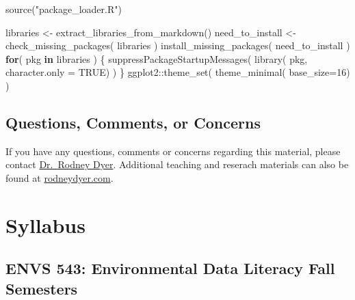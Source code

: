 \documentclass[
  letterpaper,
]{book}
\newenvironment{Shaded}{\begin{snugshade}}{\end{snugshade}}
\newcommand{\AttributeTok}[1]{\textcolor[rgb]{0.40,0.45,0.13}{#1}}
\newcommand{\ConstantTok}[1]{\textcolor[rgb]{0.56,0.35,0.01}{#1}}
\newcommand{\ControlFlowTok}[1]{\textcolor[rgb]{0.00,0.23,0.31}{\textbf{#1}}}
\newcommand{\DecValTok}[1]{\textcolor[rgb]{0.68,0.00,0.00}{#1}}
\newcommand{\FunctionTok}[1]{\textcolor[rgb]{0.28,0.35,0.67}{#1}}
\newcommand{\NormalTok}[1]{\textcolor[rgb]{0.00,0.23,0.31}{#1}}
\newcommand{\OtherTok}[1]{\textcolor[rgb]{0.00,0.23,0.31}{#1}}
\newcommand{\SpecialCharTok}[1]{\textcolor[rgb]{0.37,0.37,0.37}{#1}}
\newcommand{\StringTok}[1]{\textcolor[rgb]{0.13,0.47,0.30}{#1}}
\begin{document}
\begin{Shaded}
\begin{Highlighting}[]
\FunctionTok{source}\NormalTok{(}\StringTok{"package\_loader.R"}\NormalTok{)}

\NormalTok{libraries }\OtherTok{\textless{}{-}} \FunctionTok{extract\_libraries\_from\_markdown}\NormalTok{()}
\NormalTok{need\_to\_install }\OtherTok{\textless{}{-}} \FunctionTok{check\_missing\_packages}\NormalTok{( libraries )}
\FunctionTok{install\_missing\_packages}\NormalTok{( need\_to\_install )}
\ControlFlowTok{for}\NormalTok{( pkg }\ControlFlowTok{in}\NormalTok{ libraries ) \{ }
  \FunctionTok{suppressPackageStartupMessages}\NormalTok{( }
    \FunctionTok{library}\NormalTok{( pkg, }\AttributeTok{character.only =} \ConstantTok{TRUE}\NormalTok{) }
\NormalTok{  )}
\NormalTok{\}}
\NormalTok{ggplot2}\SpecialCharTok{::}\FunctionTok{theme\_set}\NormalTok{( }\FunctionTok{theme\_minimal}\NormalTok{( }\AttributeTok{base\_size=}\DecValTok{16}\NormalTok{) )}
\end{Highlighting}
\end{Shaded}

\section{Questions, Comments, or
Concerns}\label{questions-comments-or-concerns}

If you have any questions, comments or concerns regarding this material,
please contact \href{mailto://rjdyer@vcu.edu}{Dr.~Rodney Dyer}.
Additional teaching and reserach materials can also be found at
\href{https://rodneydyer.com}{rodneydyer.com}.


\chapter*{Syllabus}\label{syllabus}


\section*{ENVS 543: Environmental Data Literacy Fall
Semesters}\label{envs-543-environmental-data-literacy-fall-semesters}

\end{document}
